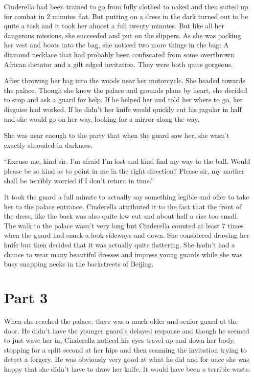 \documentclass[11pt,letterpaper]{article}
\begin{document}
Cinderella had been trained to go from fully clothed to naked and then suited up for combat in 2 minutes flat. But putting on a dress in the dark turned out to be quite a task and it took her almost a full twenty minutes. But like all her dangerous missions, she succeeded and put on the slippers. As she was packing her vest and boots into the bag, she noticed two more things in the bag: A diamond necklace that had probably been confiscated from some overthrown African dictator and a gilt edged invitation. They were both quite gorgeous.

After throwing her bag into the woods near her motorcycle. She headed towards the palace. Though she knew the palace and grounds plans by heart, she decided to stop and ask a guard for help. If he helped her and told her where to go, her disguise had worked. If he didn't her knife would quickly cut his jugular in half and she would go on her way, looking for a mirror along the way.

She was near enough to the party that when the guard saw her, she wasn't exactly shrouded in darkness.

``Excuse me, kind sir. I'm afraid I'm lost and kind find my way to the ball. Would please be so kind as to point in me in the right direction? Please sir, my mother shall be terribly worried if I don't return in time.''

It took the guard a full minute to actually say something legible and offer to take her to the palace entrance. Cinderella attributed it to the fact that the front of the dress, like the back was also quite low cut and about half a size too small. The walk to the palace wasn't very long but Cinderella counted at least 7 times when the guard had snuck a look sideways and down. She considered drawing her knife but then decided that it was actually quite flattering. She hadn't had a chance to wear many beautiful dresses and impress young guards while she was busy snapping necks in the backstreets of Beijing.

\section*{Part 3}

When she reached the palace, there was a much older and senior guard at the door. He didn't have the younger guard's delayed response and though he seemed to just wave her in, Cinderella noticed his eyes travel up and down her body, stopping for a split second at her hips and then scanning the invitation trying to detect a forgery. He was obviously very good at what he did and for once she was happy that she didn't have to draw her knife. It would have been a terrible waste.
\end{document}
